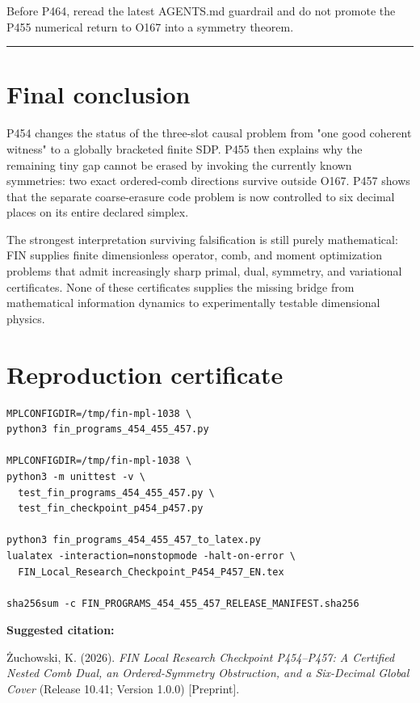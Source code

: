 \documentclass[11pt,a4paper,openany]{report}
\begin{document}
Before P464, reread the latest AGENTS.md guardrail and do not promote the P455 numerical return to O167 into a symmetry theorem.

\par\medskip\hrule\medskip

\chapter{Final conclusion}

P454 changes the status of the three-slot causal problem from "one good coherent witness" to a globally bracketed finite SDP. P455 then explains why the remaining tiny gap cannot be erased by invoking the currently known symmetries: two exact ordered-comb directions survive outside O167. P457 shows that the separate coarse-erasure code problem is now controlled to six decimal places on its entire declared simplex.

The strongest interpretation surviving falsification is still purely mathematical: FIN supplies finite dimensionless operator, comb, and moment optimization problems that admit increasingly sharp primal, dual, symmetry, and variational certificates. None of these certificates supplies the missing bridge from mathematical information dynamics to experimentally testable dimensional physics.


\clearpage
\chapter*{Reproduction certificate}
\begin{Verbatim}[fontsize=\small]
MPLCONFIGDIR=/tmp/fin-mpl-1038 \
python3 fin_programs_454_455_457.py

MPLCONFIGDIR=/tmp/fin-mpl-1038 \
python3 -m unittest -v \
  test_fin_programs_454_455_457.py \
  test_fin_checkpoint_p454_p457.py

python3 fin_programs_454_455_457_to_latex.py
lualatex -interaction=nonstopmode -halt-on-error \
  FIN_Local_Research_Checkpoint_P454_P457_EN.tex

sha256sum -c FIN_PROGRAMS_454_455_457_RELEASE_MANIFEST.sha256
\end{Verbatim}

\noindent\textbf{Suggested citation:}

\.Zuchowski, K. (2026). \emph{FIN Local Research Checkpoint P454--P457:
A Certified Nested Comb Dual, an Ordered-Symmetry Obstruction, and a
Six-Decimal Global Cover} (Release 10.41; Version 1.0.0) [Preprint].
\end{document}
